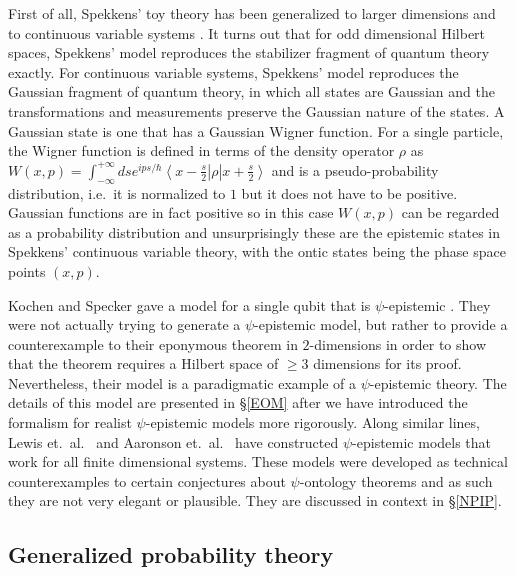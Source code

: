 \documentclass[DIV=calc,paper=a4,fontsize=11pt,twocolumn]{scrartcl} %
\theoremstyle{definition}
\theoremstyle{plain}
\newcommand{\Ket}[1]{\ensuremath{\left \vert #1 \right \rangle}}
\newcommand{\Bra}[1]{\ensuremath{\left \langle #1 \right \vert}}
\begin{document}
First of all, Spekkens' toy theory has been generalized to larger
dimensions \cite{Schreiber} and to continuous variable systems
\cite{Bartlett2012}.  It turns out that for odd dimensional Hilbert
spaces, Spekkens' model reproduces the stabilizer fragment of quantum
theory exactly.  For continuous variable systems, Spekkens' model
reproduces the Gaussian fragment of quantum theory, in which all
states are Gaussian and the transformations and measurements preserve
the Gaussian nature of the states.  A Gaussian state is one that has a
Gaussian Wigner function.  For a single particle, the Wigner function
is defined in terms of the density operator $\rho$ as $W(x,p) =
\int_{-\infty}^{+\infty} ds e^{ips/\hbar} \Bra{x - \frac{s}{2}} \rho
\Ket{x + \frac{s}{2}}$ and is a pseudo-probability distribution, i.e.\
it is normalized to $1$ but it does not have to be positive.  Gaussian
functions are in fact positive so in this case $W(x,p)$ can be
regarded as a probability distribution and unsurprisingly these are
the epistemic states in Spekkens' continuous variable theory, with the
ontic states being the phase space points $(x,p)$.

Kochen and Specker gave a model for a single qubit that is
$\psi$-epistemic \cite{Kochen1967}.  They were not actually trying to
generate a $\psi$-epistemic model, but rather to provide a
counterexample to their eponymous theorem in $2$-dimensions in order
to show that the theorem requires a Hilbert space of $\geq 3$
dimensions for its proof.  Nevertheless, their model is a paradigmatic
example of a $\psi$-epistemic theory.  The details of this model are
presented in \S\ref{EOM} after we have introduced the formalism for
realist $\psi$-epistemic models more rigorously.  Along similar lines,
Lewis et.\ al.\ \cite{Lewis2012} and Aaronson et.\ al.\
\cite{Aaronson2013} have constructed $\psi$-epistemic models that work
for all finite dimensional systems.  These models were developed as
technical counterexamples to certain conjectures about $\psi$-ontology
theorems and as such they are not very elegant or plausible.  They are
discussed in context in \S\ref{NPIP}.

\subsection{Generalized probability theory}

\label{GenProb}
\end{document}
